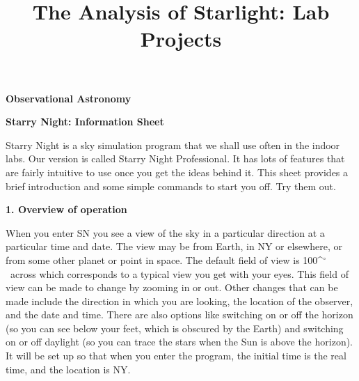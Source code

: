 \documentclass[12pt]{article}
\title{The Analysis of Starlight: Lab Projects}
\begin{document}
\setcounter{page}{1}
\setcounter{equation}{0}
\pagestyle{plain}
\thispagestyle{empty}  %
\newcommand{\kms}{\hbox{km\,s$^{\rm -1}$}}
\def\lo {\ifmmode {\,{\it L}\solar} \else $\,L$\solar\fi}       %
\def\my {\ifmmode {\,{\it M}\solar\,{\rm yr^{-1}}}              %
        \else {$\,M$\solar$\,$yr$^{\rm -1}$}\fi}
\def\BD {BD$\,$+30{\degr}3639}
\def\HUNO{\rm H$\,$I}                   %
\def\HDOS{\rm H$_2$}                    %
\def\arcsec{\ifmmode {^{\scriptscriptstyle\prime\prime}}
          \else $^{\scriptscriptstyle\prime\prime}$\fi}
\def\arcminm{\ifmmode {^{\scriptscriptstyle\prime}}
          \else $^{\scriptscriptstyle\prime}$\fi}
\def\deg{\ifmmode^\circ\else$^\circ$\fi}







\noindent
{\bf Observational Astronomy    \hfill} 


\bigskip

\medskip

\noindent
{\hfill \Large {\bf Starry Night: Information Sheet} \hfill}


\bigskip

\noindent
Starry Night is a sky simulation program that we shall use often in
the indoor labs. Our version is called Starry Night Professional. It
has lots of features that are fairly intuitive to use once you get the
ideas behind it. This sheet provides a brief introduction and some simple
commands to start you off. Try them out.

\medskip
\noindent
{\bf 1. Overview of operation}

\smallskip
\noindent
When you enter SN you see a view of the sky in a particular direction
at a particular time and date. The view may be from Earth, in NY or
elsewhere, or from some other planet or point in space. The default
field of view is 100\deg\ across which corresponds to a typical view
you get with your eyes. This field of view can be made to change by
zooming in or out. Other changes that can be made include the
direction in which you are looking, the location of the observer, and
the date and time. There are also options like switching on or off the
horizon (so you can see below your feet, which is obscured by the
Earth) and switching on or off daylight (so you can trace the stars
when the Sun is above the horizon). It will be set up so that when you
enter the program, the initial time is the real time, and the location
is NY.
\end{document}
